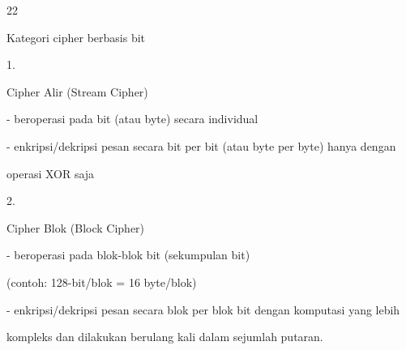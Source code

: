 \documentclass{article}
\begin{document}

22

Kategori cipher berbasis bit

1.

Cipher Alir (Stream Cipher)


- beroperasi pada bit (atau byte) secara individual


- enkripsi/dekripsi pesan secara bit per bit (atau byte per byte) hanya dengan

          operasi XOR saja

2.

Cipher Blok (Block Cipher)


- beroperasi pada blok-blok bit (sekumpulan bit)


  (contoh: 128-bit/blok = 16 byte/blok)


- enkripsi/dekripsi pesan secara blok per blok bit dengan komputasi yang lebih

            kompleks dan dilakukan berulang kali dalam sejumlah putaran.
\end{document}
